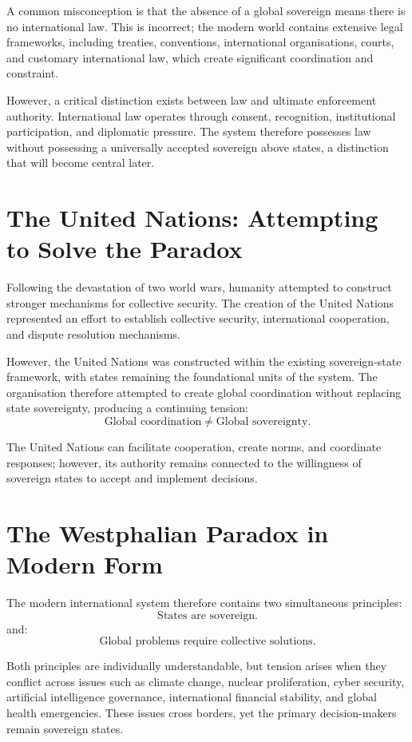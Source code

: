 \documentclass[11pt,openany]{book}
\theoremstyle{plain}
\theoremstyle{definition}
\begin{document}
A common misconception is that the absence of a global sovereign means there is no international law. This is incorrect; the modern world contains extensive legal frameworks, including treaties, conventions, international organisations, courts, and customary international law, which create significant coordination and constraint.

However, a critical distinction exists between law and ultimate enforcement authority. International law operates through consent, recognition, institutional participation, and diplomatic pressure. The system therefore possesses law without possessing a universally accepted sovereign above states, a distinction that will become central later.

\section*{The United Nations: Attempting to Solve the Paradox}

Following the devastation of two world wars, humanity attempted to construct stronger mechanisms for collective security. The creation of the United Nations represented an effort to establish collective security, international cooperation, and dispute resolution mechanisms.

However, the United Nations was constructed within the existing sovereign-state framework, with states remaining the foundational units of the system. The organisation therefore attempted to create global coordination without replacing state sovereignty, producing a continuing tension:
\[
\text{Global coordination}
\neq
\text{Global sovereignty}.
\]

The United Nations can facilitate cooperation, create norms, and coordinate responses; however, its authority remains connected to the willingness of sovereign states to accept and implement decisions.

\section*{The Westphalian Paradox in Modern Form}

The modern international system therefore contains two simultaneous principles:
\[
\boxed{
\text{States are sovereign.}
}
\]
and:
\[
\boxed{
\text{Global problems require collective solutions.}
}
\]

Both principles are individually understandable, but tension arises when they conflict across issues such as climate change, nuclear proliferation, cyber security, artificial intelligence governance, international financial stability, and global health emergencies. These issues cross borders, yet the primary decision-makers remain sovereign states.
\end{document}
